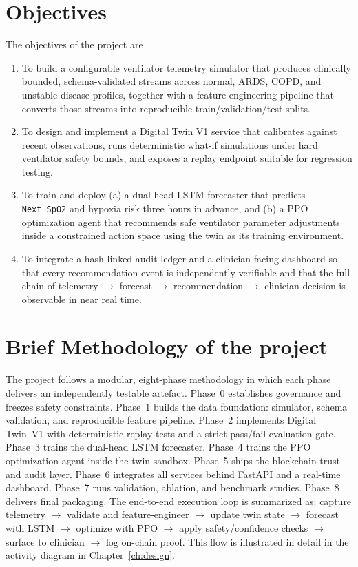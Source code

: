 \documentclass[12pt,a4paper,oneside]{report}
\begin{document}
\section{Objectives}
The objectives of the project are
\begin{enumerate}[leftmargin=*]
  \item To build a configurable ventilator telemetry simulator that produces clinically bounded, schema-validated streams across normal, ARDS, COPD, and unstable disease profiles, together with a feature-engineering pipeline that converts those streams into reproducible train/validation/test splits.
  \item To design and implement a Digital Twin V1 service that calibrates against recent observations, runs deterministic what-if simulations under hard ventilator safety bounds, and exposes a replay endpoint suitable for regression testing.
  \item To train and deploy (a) a dual-head LSTM forecaster that predicts \texttt{Next\_SpO2} and hypoxia risk three hours in advance, and (b) a PPO optimization agent that recommends safe ventilator parameter adjustments inside a constrained action space using the twin as its training environment.
  \item To integrate a hash-linked audit ledger and a clinician-facing dashboard so that every recommendation event is independently verifiable and that the full chain of telemetry $\rightarrow$ forecast $\rightarrow$ recommendation $\rightarrow$ clinician decision is observable in near real time.
\end{enumerate}

\section{Brief Methodology of the project}
The project follows a modular, eight-phase methodology in which each phase delivers an independently testable artefact. Phase~0 establishes governance and freezes safety constraints. Phase~1 builds the data foundation: simulator, schema validation, and reproducible feature pipeline. Phase~2 implements Digital Twin~V1 with deterministic replay tests and a strict pass/fail evaluation gate. Phase~3 trains the dual-head LSTM forecaster. Phase~4 trains the PPO optimization agent inside the twin sandbox. Phase~5 ships the blockchain trust and audit layer. Phase~6 integrates all services behind FastAPI and a real-time dashboard. Phase~7 runs validation, ablation, and benchmark studies. Phase~8 delivers final packaging. The end-to-end execution loop is summarized as: capture telemetry $\rightarrow$ validate and feature-engineer $\rightarrow$ update twin state $\rightarrow$ forecast with LSTM $\rightarrow$ optimize with PPO $\rightarrow$ apply safety/confidence checks $\rightarrow$ surface to clinician $\rightarrow$ log on-chain proof. This flow is illustrated in detail in the activity diagram in Chapter~\ref{ch:design}.
\end{document}
